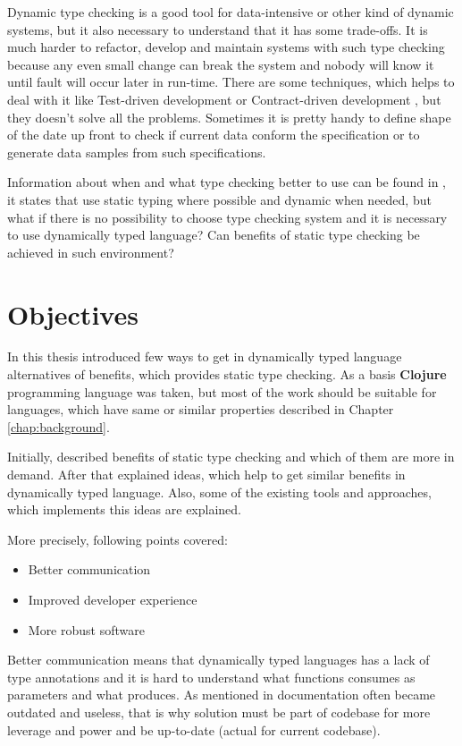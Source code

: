 Dynamic type checking is a good tool for data-intensive or other kind of dynamic
systems, but it also necessary to understand that it has some trade-offs. It is
much harder to refactor, develop and maintain systems with such type checking
because any even small change can break the system and nobody will know it until
fault will occur later in run-time. There are some techniques, which helps to
deal with it like Test-driven development \cite{beck2003test} or Contract-driven
development \cite{meyer2007contract}, but they doesn't solve all the problems.
Sometimes it is pretty handy to define shape of the date up front to check if
current data conform the specification or to generate data samples from such
specifications.

Information about when and what type checking better to use can be found in
\cite{meijer2004static}, it states that use static typing where possible and
dynamic when needed, but what if there is no possibility to choose type checking
system and it is necessary to use dynamically typed language? Can benefits of
static type checking be achieved in such environment?


\section{Objectives}
In this thesis introduced few ways to get in dynamically typed language
alternatives of benefits, which provides static type checking. As a basis
\textbf{Clojure} programming language was taken, but most of the work should be
suitable for languages, which have same or similar properties described in Chapter
\ref{chap:background}.

Initially, described benefits of static type checking and which of them are more
in demand. After that explained ideas, which help to get similar benefits in
dynamically typed language. Also, some of the existing tools and approaches,
which implements this ideas are explained.

More precisely, following points covered:
\begin{itemize}
\item Better communication
\item Improved developer experience
\item More robust software
\end{itemize}

Better communication means that dynamically typed languages has a lack of type
annotations and it is hard to understand what functions consumes as parameters
and what produces. As mentioned in \cite{janes2014lean} documentation often
became outdated and useless, that is why solution must be part of codebase for
more leverage and power and be up-to-date (actual for current codebase).


